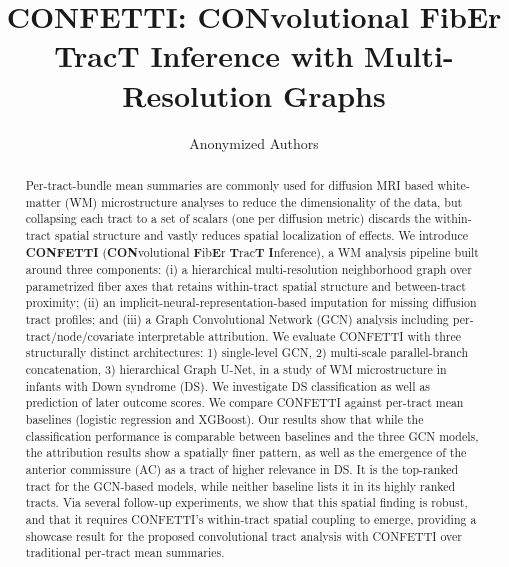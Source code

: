 \documentclass[runningheads]{llncs}
\begin{document}
\title{CONFETTI: CONvolutional FibEr TracT Inference
with Multi-Resolution Graphs}

\author{Anonymized Authors}

\maketitle

\begin{abstract}
Per-tract-bundle mean summaries are commonly used for diffusion MRI based
white-matter (WM) microstructure analyses to reduce the dimensionality of
the data, but collapsing each tract to a set of scalars (one per diffusion
metric) discards the within-tract spatial structure and vastly reduces
spatial localization of effects. We introduce \textbf{CONFETTI}
(\textbf{CON}volutional \textbf{F}ib\textbf{E}r \textbf{T}rac\textbf{T}
\textbf{I}nference), a WM analysis pipeline built around three
components: (i) a hierarchical multi-resolution neighborhood graph over
parametrized fiber axes that retains within-tract spatial structure and
between-tract proximity; (ii) an implicit-neural-representation-based
imputation for missing diffusion tract profiles; and (iii) a Graph
Convolutional Network (GCN) analysis including per-tract/node/covariate
interpretable attribution. We evaluate CONFETTI with three structurally
distinct architectures: 1) single-level GCN, 2) multi-scale parallel-branch
concatenation, 3) hierarchical Graph U-Net, in a study of WM microstructure
in infants with Down syndrome (DS). We investigate DS classification as
well as prediction of later outcome scores. We compare
CONFETTI against per-tract mean baselines (logistic regression and
XGBoost). Our results show that while the classification performance is
comparable between baselines and the three GCN models, the attribution
results show a spatially finer pattern, as well as the emergence of the
anterior commissure (AC) as a tract of higher relevance in DS. It is the
top-ranked tract for the GCN-based models, while neither baseline lists it
in its highly ranked tracts. Via several follow-up experiments, we show
that this spatial finding is robust, and that it requires CONFETTI's
within-tract spatial coupling to emerge, providing a showcase result for
the proposed convolutional tract analysis with CONFETTI over traditional
per-tract mean summaries.

\end{abstract}
\end{document}
